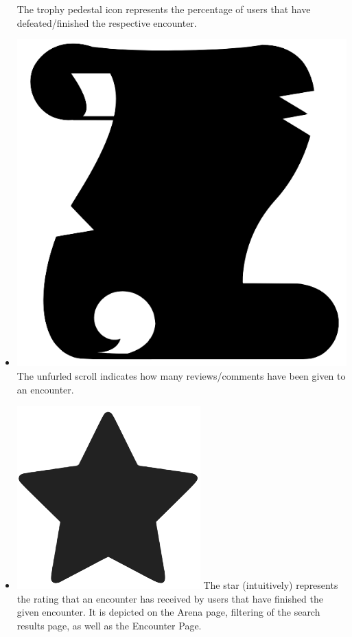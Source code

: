 \documentclass[12pt,a4paper]{report}
\begin{document}
\begin{itemize}
		The trophy pedestal icon represents the percentage of users that have defeated/finished the respective encounter.
		\item \includegraphics[scale=.03]{scroll}
		The unfurled scroll indicates how many reviews/comments have been given to an encounter.
		\item \includegraphics[scale=.07]{rating_icon}
		The star (intuitively) represents the rating that an encounter has received by users that have finished the given encounter. It is depicted on the Arena page, filtering of the search results page, as well as the Encounter Page.

\end{itemize}
\end{document}

